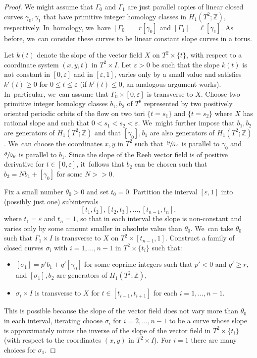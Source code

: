 \documentclass[10pt]{amsart}
\newcommand{\spp}[2]{\sfrac{\partial#1}{\partial#2}}
\theoremstyle{definition}
\begin{document}
\begin{proof}
We might assume that $\Gamma_0$ and $\Gamma_1$ are just parallel copies of linear closed curves $\gamma_0, \gamma_1$ that have primitive integer homology classes in $H_1(T^2;\mathbb{Z})$, respectively. In~homology, we~have $[\Gamma_0]=r[\gamma_0]$ and $[\Gamma_1]=\ell[\gamma_1]$. As before, we~can consider these curves to be linear constant slope curves in a torus.

Let $k(t)$ denote the slope of the vector field $X$ on $T^2\times \{t\}$, with respect to a coordinate system $(x,y,t)$ in $T^2\times I$. Let $\varepsilon>0$ be such that the slope $k(t)$ is not constant in $[0,\varepsilon]$ and in $[\varepsilon, 1]$, varies only by a small value and satisfies $k'(t)\geq 0$ for $0\leq t\leq \varepsilon$ (if $k'(t)\leq 0$, an analogous argument works). In~particular, we~can assume that $\Gamma_0\times [0, \varepsilon]$ is transverse to $X$. Choose two primitive integer homology classes $b_1, b_2$ of $T^2$ represented by two positively oriented periodic orbits of the flow on two tori $\{t=s_1\}$ and $\{t=s_2\}$ where $X$ has rational slope and such that $0<s_1<s_2<\varepsilon$. We~might further impose that $b_1,b_2$ are generators of $H_1(T^2;\mathbb{Z})$ and that $[\gamma_0],b_1$ are also generators of $H_1(T^2;\mathbb{Z})$. We~can choose the coordinates $x,y$ in $T^2$ such that~$\spp{}{x}$ is parallel to $\gamma_0$ and $\spp{}{y}$ is parallel to $b_1$. Since the slope of the Reeb vector field is of positive derivative for $t\in [0,\varepsilon]$, it~follows that $b_2$ can be chosen such that $b_2=Nb_1+[\gamma_0]$ for some $N>>0$.

Fix a small number $\theta_0>0$ and set $t_0=0$. Partition the interval $[\varepsilon,1]$ into (possibly just one) subintervals
\[
[t_1,t_2], [t_2,t_3],\dots, [t_{n-1},t_n],
\]
where $t_1=\varepsilon$ and $t_n=1$, so that in each interval the slope is non-constant and varies only by some amount smaller in absolute value than $\theta_0$. We~can take $\theta_0$ such that $\Gamma_1\times I$ is transverse to $X$ on $T^2\times [t_{n-1},1]$. Construct a family of closed curves $\sigma_i$ with $i=1,\dots,n-1$ in $T^2\times \{t_i\}$ such that:
\begin{itemize}
\item
$[\sigma_1]=p'b_1+q'[\gamma_0]$ for some coprime integers such that $p'<0$ and $q'\geq r$, and $[\sigma_1],b_2$ are generators of $H_1(T^2;\mathbb{Z})$,
\item
$\sigma_i\times I$ is transverse to $X$ for $t\in[t_{i-1},t_{i+1}]$ for each $i=1,\dots,n-1$.
\end{itemize}
This is possible because the slope of the vector field does not vary more than $\theta_0$ in each interval, iterating choose $\sigma_i$ for $i=2,\dots,n-1$ to be a curve whose slope is approximately minus the inverse of the slope of the vector field in $T^2\times \{t_i\}$ (with respect to the coordinates $(x,y)$ in $T^2 \times I$). For $i=1$ there are many choices for $\sigma_1$.


\end{proof}
\end{document}
